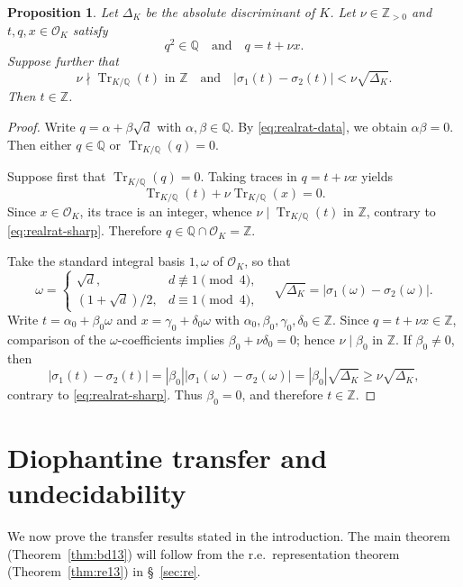 \documentclass[12pt]{amsart}
\numberwithin{equation}{section}
\newtheorem{proposition}[theorem]{Proposition}
\theoremstyle{remark}
\theoremstyle{plain}
\newcommand{\Z}{\mathbb{Z}}
\newcommand{\Q}{\mathbb{Q}}
\newcommand{\sO}{\mathcal{O}}
\newcommand{\Tr}{\operatorname{Tr}}
\begin{document}
\begin{proposition}\label{prop:real-rationality}
Let $\Delta_K$ be the absolute discriminant of $K$. Let $\nu\in\Z_{>0}$ and $t,q,x\in\sO_K$ satisfy
\begin{equation}\label{eq:realrat-data}
q^2\in\Q\quad\text{and}\quad q=t+\nu x.
\end{equation}
Suppose further that
\begin{equation}\label{eq:realrat-sharp}
\nu\nmid \Tr_{K/\Q}(t)\text{ in }\Z\quad\text{and}\quad|\sigma_1(t)-\sigma_2(t)|<\nu\sqrt{\Delta_K}.
\end{equation}
Then $t\in\Z$.
\end{proposition}
\begin{proof}
Write $q=\alpha+\beta\sqrt{d}$ with $\alpha,\beta\in\Q$. By \eqref{eq:realrat-data}, we obtain $\alpha\beta=0$. Then either $q\in\Q$ or $\Tr_{K/\Q}(q)=0$.

Suppose first that $\Tr_{K/\Q}(q)=0$. Taking traces in $q=t+\nu x$ yields
\[
\Tr_{K/\Q}(t)+\nu\Tr_{K/\Q}(x)=0.
\]
Since $x\in\sO_K$, its trace is an integer, whence $\nu\mid\Tr_{K/\Q}(t)$ in $\Z$, contrary to \eqref{eq:realrat-sharp}. Therefore $q\in\Q\cap\sO_K=\Z$.

Take the standard integral basis $1,\omega$ of $\sO_K$, so that
\[
\omega=
\begin{cases}
\sqrt{d},&d\not\equiv1\pmod{4},\\[2pt]
(1+\sqrt{d})/2,&d\equiv1\pmod{4},
\end{cases}
\quad
\sqrt{\Delta_K}=|\sigma_1(\omega)-\sigma_2(\omega)|.
\]
Write $t=\alpha_0+\beta_0\omega$ and $x=\gamma_0+\delta_0\omega$ with $\alpha_0,\beta_0,\gamma_0,\delta_0\in\Z$. Since $q=t+\nu x\in\Z$, comparison of the $\omega$-coefficients implies $\beta_0+\nu\delta_0=0$; hence $\nu\mid\beta_0$ in $\Z$. If $\beta_0\neq0$, then
\[
|\sigma_1(t)-\sigma_2(t)|=|\beta_0||\sigma_1(\omega)-\sigma_2(\omega)|=|\beta_0|\sqrt{\Delta_K}\geq\nu\sqrt{\Delta_K},
\]
contrary to \eqref{eq:realrat-sharp}. Thus $\beta_0=0$, and therefore $t\in\Z$.
\end{proof}

\section{Diophantine transfer and undecidability}\label{sec:logic-pf}
We now prove the transfer results stated in the introduction. The main theorem (Theorem~\ref{thm:bd13}) will follow from the r.e.\ representation theorem (Theorem~\ref{thm:re13}) in \S~\ref{sec:re}.
\end{document}
